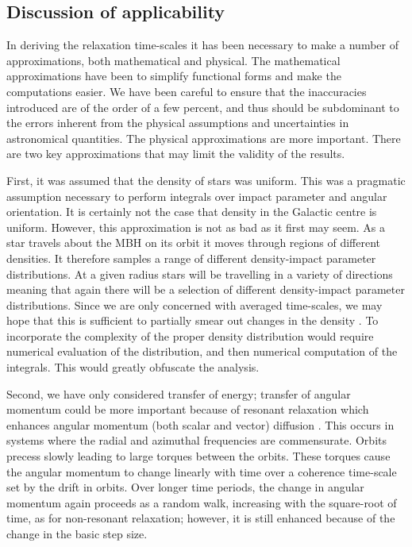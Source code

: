 \documentclass[useAMS,usedcolumn,usegraphicx,usenatbib]{mn2e}
\begin{document}
\begin{onecolumn}
\subsection{Discussion of applicability}

In deriving the relaxation time-scales it has been necessary to make a number of approximations, both mathematical and physical. The mathematical approximations have been to simplify functional forms and make the computations easier. We have been careful to ensure that the inaccuracies introduced are of the order of a few percent, and thus should be subdominant to the errors inherent from the physical assumptions and uncertainties in astronomical quantities. The physical approximations are more important. There are two key approximations that may limit the validity of the results.

First, it was assumed that the density of stars was uniform. This was a pragmatic assumption necessary to perform integrals over impact parameter and angular orientation. It is certainly not the case that density in the Galactic centre is uniform. However, this approximation is not as bad as it first may seem. As a star travels about the MBH on its orbit it moves through regions of different densities. It therefore samples a range of different density-impact parameter distributions. At a given radius stars will be travelling in a variety of directions meaning that again there will be a selection of different density-impact parameter distributions. Since we are only concerned with averaged time-scales, we may hope that this is sufficient to partially smear out changes in the density \citep[cf. ][]{Just2011}. To incorporate the complexity of the proper density distribution would require numerical evaluation of the distribution, and then numerical computation of the integrals. This would greatly obfuscate the analysis.

Second, we have only considered transfer of energy; transfer of angular momentum could be more important because of resonant relaxation which enhances angular momentum (both scalar and vector) diffusion \citep{Rauch1996,Rauch1998,Gurkan2007,Eilon2009}. This occurs in systems where the radial and azimuthal frequencies are commensurate. Orbits precess slowly leading to large torques between the orbits. These torques cause the angular momentum to change linearly with time over a coherence time-scale set by the drift in orbits. Over longer time periods, the change in angular momentum again proceeds as a random walk, increasing with the square-root of time, as for non-resonant relaxation; however, it is still enhanced because of the change in the basic step size.


\end{onecolumn}
\end{document}
